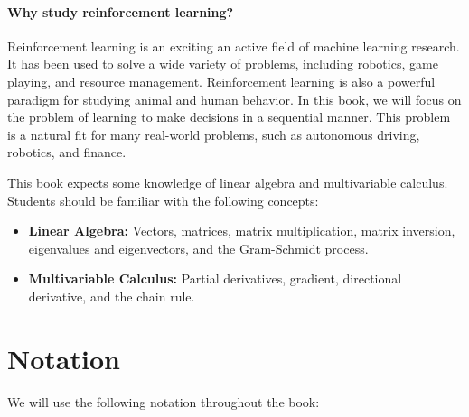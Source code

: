 \documentclass[../main/main]{subfiles}
\begin{document}
\paragraph{Why study reinforcement learning?} Reinforcement learning is an exciting an active field of machine learning research. It has been used to solve a wide variety of problems, including robotics, game playing, and resource management. Reinforcement learning is also a powerful paradigm for studying animal and human behavior. In this book, we will focus on the problem of learning to make decisions in a sequential manner. This problem is a natural fit for many real-world problems, such as autonomous driving, robotics, and finance.


This book expects some knowledge of linear algebra and multivariable calculus. Students should be familiar with the following concepts:

\begin{itemize}
    \item \textbf{Linear Algebra:} Vectors, matrices, matrix multiplication, matrix inversion, eigenvalues and eigenvectors, and the Gram-Schmidt process.
    \item \textbf{Multivariable Calculus:} Partial derivatives, gradient, directional derivative, and the chain rule.
\end{itemize}


\section{Notation}

We will use the following notation throughout the book:
\end{document}
